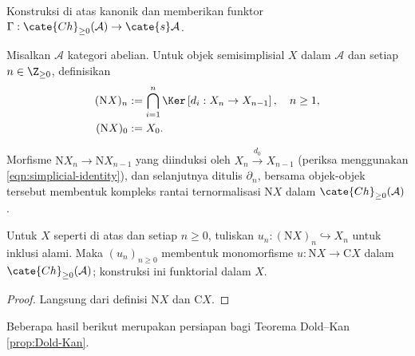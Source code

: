 Konstruksi di atas kanonik dan memberikan funktor
$\Gamma:\cate{Ch}_{\geq0}(\mathcal{A})\to\cate{s}\mathcal{A}$.

\begin{definition}\label{def:normalized-cplx}
	Misalkan $\mathcal{A}$ kategori abelian. Untuk objek semisimplisial $X$ dalam
	$\mathcal{A}$ dan setiap $n\in\Z_{\geq0}$, definisikan
	\begin{align*}
		(\mathrm{N} X)_n & := \bigcap_{i=1}^n \Ker\left[ d_i: X_n \to X_{n-1} \right], \quad n \geq 1, \\
		(\mathrm{N} X)_0 & := X_0.
	\end{align*}

	Morfisme $\mathrm{N}X_n\to\mathrm{N}X_{n-1}$ yang diinduksi oleh
	$X_n\xrightarrow{d_0}X_{n-1}$ (periksa menggunakan
	\eqref{eqn:simplicial-identity}), dan selanjutnya ditulis $\partial_n$,
	bersama objek-objek tersebut membentuk kompleks rantai ternormalisasi
	$\mathrm{N}X$ dalam $\cate{Ch}_{\geq0}(\mathcal{A})$.
\end{definition}

\begin{proposition}\label{prop:Dold-Kan-u}
	Untuk $X$ seperti di atas dan setiap $n\geq0$, tuliskan
	$u_n:(\mathrm{N}X)_n\hookrightarrow X_n$ untuk inklusi alami. Maka
	$(u_n)_{n\geq0}$ membentuk monomorfisme
	$u:\mathrm{N}X\to\mathrm{C}X$ dalam
	$\cate{Ch}_{\geq0}(\mathcal{A})$; konstruksi ini funktorial dalam $X$.
\end{proposition}
\begin{proof}
	Langsung dari definisi $\mathrm{N}X$ dan $\mathrm{C}X$.
\end{proof}

Beberapa hasil berikut merupakan persiapan bagi Teorema Dold--Kan
\ref{prop:Dold-Kan}.

